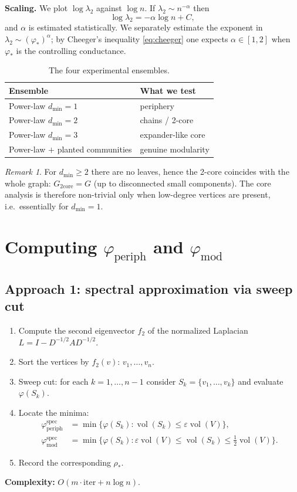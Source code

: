\documentclass[11pt,a4paper]{article}
\theoremstyle{plain}
\theoremstyle{definition}
\theoremstyle{remark}
\newtheorem{remark}[theorem]{Remark}
\DeclareMathOperator{\vol}{vol}
\newcommand{\core}{\mathrm{core}}
\newcommand{\periph}{\mathrm{periph}}
\newcommand{\modu}{\mathrm{mod}}
\newcommand{\Ph}{\varphi}
\newcommand{\dmin}{d_{\min}}
\newcommand{\lamtwo}{\lambda_2}
\begin{document}
\textbf{Scaling.} We plot $\log\lamtwo$ against $\log n$. If
$\lamtwo\sim n^{-\alpha}$ then
\begin{equation}
\log\lamtwo=-\alpha\log n+C,
\end{equation}
and $\alpha$ is estimated statistically. We separately estimate the exponent in
$\lamtwo\sim(\Ph_*)^\alpha$; by Cheeger's inequality \eqref{eq:cheeger} one
expects $\alpha\in[1,2]$ when $\Ph_*$ is the controlling conductance.

\begin{table}[h]
\centering
\begin{tabular}{lp{8.5cm}}
\toprule
Ensemble & What we test \\
\midrule
Power-law $\dmin=1$ & periphery \\
Power-law $\dmin=2$ & chains / 2-core \\
Power-law $\dmin=3$ & expander-like core \\
Power-law $+$ planted communities & genuine modularity \\
\bottomrule
\end{tabular}
\caption{The four experimental ensembles.}
\end{table}

\begin{remark}
For $\dmin\ge 2$ there are no leaves, hence the 2-core coincides with the whole
graph: $G_{2\core}=G$ (up to disconnected small components). The core analysis
is therefore non-trivial only when low-degree vertices are present, i.e.\
essentially for $\dmin=1$.
\end{remark}

\section{Computing $\Ph_{\periph}$ and $\Ph_{\modu}$}
\label{sec:algorithm}

\subsection*{Approach 1: spectral approximation via sweep cut}

\begin{enumerate}[leftmargin=*]
\item Compute the second eigenvector $f_2$ of the normalized Laplacian
$L=I-D^{-1/2}AD^{-1/2}$.
\item Sort the vertices by $f_2(v)$: $v_1,\dots,v_n$.
\item Sweep cut: for each $k=1,\dots,n-1$ consider
$S_k=\{v_1,\dots,v_k\}$ and evaluate $\Ph(S_k)$.
\item Locate the minima:
\begin{align}
\Ph_{\periph}^{\mathrm{spec}}
&=\min\{\Ph(S_k):\vol(S_k)\le\varepsilon\vol(V)\},\\
\Ph_{\modu}^{\mathrm{spec}}
&=\min\{\Ph(S_k):\varepsilon\vol(V)\le\vol(S_k)\le\tfrac12\vol(V)\}.
\end{align}
\item Record the corresponding $\rho_*$.
\end{enumerate}
\textbf{Complexity:} $O(m\cdot\mathrm{iter}+n\log n)$.
\end{document}
